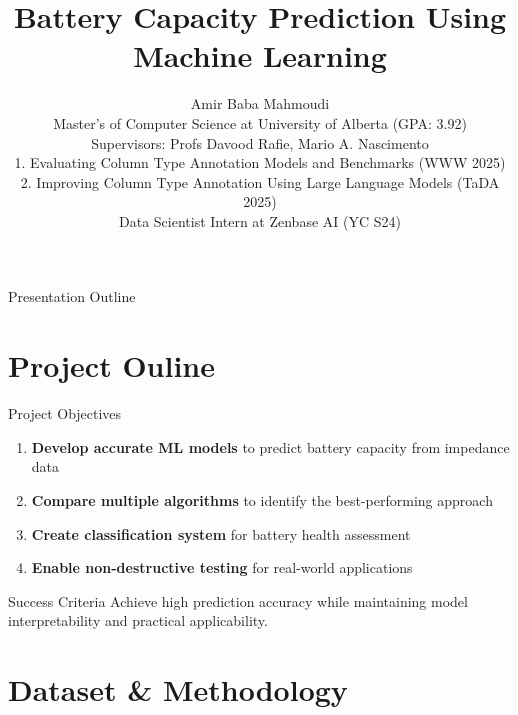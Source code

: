 \documentclass[aspectratio=169]{beamer}
\title{Battery Capacity Prediction Using Machine Learning}
\author{Amir Baba Mahmoudi\\
Master's of Computer Science at University of Alberta (GPA: 3.92)\\
Supervisors: Profs Davood Rafie, Mario A. Nascimento\\
1. Evaluating Column Type Annotation Models and Benchmarks (WWW 2025)\\ 
2. Improving Column Type Annotation Using Large Language Models (TaDA 2025)\\
Data Scientist Intern at Zenbase AI (YC S24)\\
}
\date{}
\begin{document}
\begin{frame}
\titlepage
\end{frame}

\begin{frame}{Presentation Outline}
\tableofcontents
\end{frame}



\section{Project Ouline}


\begin{frame}{Project Objectives}
\begin{enumerate}
\item \textbf{Develop accurate ML models} to predict battery capacity from impedance data
\vspace{0.3cm}
\item \textbf{Compare multiple algorithms} to identify the best-performing approach
\vspace{0.3cm}
\item \textbf{Create classification system} for battery health assessment
\vspace{0.3cm}
\item \textbf{Enable non-destructive testing} for real-world applications
\end{enumerate}

\vspace{0.5cm}
\begin{alertblock}{Success Criteria}
Achieve high prediction accuracy while maintaining model interpretability and practical applicability.
\end{alertblock}
\end{frame}

\section{Dataset \& Methodology}
\end{document}

